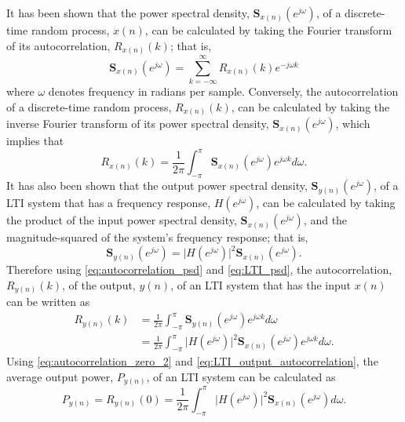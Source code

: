 It has been shown \cite{oppenheim_discrete-time_1999} that the power spectral
density, $\bm{S}_{x(n)}(e^{j\omega})$, of a discrete-time random process,
$x(n)$, can be calculated by taking the Fourier transform of its autocorrelation,
$R_{x(n)}(k)$; that is,
\begin{equation}\label{eq:power_spectrum}
 \bm{S}_{x(n)}(e^{j\omega})=\sum_{k=-\infty}^{\infty}{R_{x(n)}(k)e^{
-j\omega k}}
\end{equation}
where $\omega$ denotes frequency in radians per sample. Conversely, the autocorrelation of
a discrete-time random process, $R_{x(n)}(k)$, can be calculated by taking the inverse
Fourier transform of its power spectral density, $\bm{S}_{x(n)}(e^{j\omega})$, which
implies that 
\begin{equation}\label{eq:autocorrelation_psd}
 R_{x(n)}(k)=\frac{1}{2\pi}\int_{-\pi}^{\pi}{\bm{S}_{x(n)}(e^{j\omega})
e^{j\omega k} d\omega} \text{.}
\end{equation}
It has also been shown \cite{hsu_schaums_1996}\cite{oppenheim_discrete-time_1999} that
the output power spectral density, $\bm{S}_{y(n)}(e^{j\omega})$, of a LTI
system that has a frequency response, $H(e^{j\omega})$, can be calculated by
taking the product of the input power spectral density,
$\bm{S}_{x(n)}(e^{j\omega})$, and the magnitude-squared of the
system's frequency response; that is, 
\begin{equation}\label{eq:LTI_psd}
 \bm{S}_{y(n)}(e^{j\omega})=\lvert
H(e^{j\omega})\rvert^2\bm{S}_{x(n)}(e^{j\omega})\text{.}
\end{equation}
Therefore using \eqref{eq:autocorrelation_psd} and \eqref{eq:LTI_psd}, the
autocorrelation,
$R_{y(n)}(k)$, of the output, $y(n)$, of an LTI system that has the input $x(n)$ can be
written as
\begin{equation}\label{eq:LTI_output_autocorrelation}
\begin{split}
R_{y(n)}(k)& =\frac{1}{2\pi}\int_{-\pi}^{\pi}\bm{S}_{y(n)}(e^{j\omega})e^{
j\omega k} d\omega\\
& = \frac{1}{2\pi}\int_{-\pi}^{\pi}
\lvert H(e^{j\omega})\rvert^2\bm{S}_{x(n)}(e^{j\omega})e^{
j\omega k} d\omega.
\end{split}
\end{equation}
Using \eqref{eq:autocorrelation_zero_2} and \eqref{eq:LTI_output_autocorrelation}, the
average output power, $P_{y(n)}$, of an LTI system can be calculated as
\begin{equation}\label{eq:LTI_average_output_power}
P_{y(n)}=R_{y(n)}(0)=\frac{1}{2\pi}\int_{-\pi}^{\pi}
\lvert
H(e^{j\omega})\rvert^2\bm{S}_{x(n)}(e^{j\omega})d\omega\text{.}
\end{equation}

